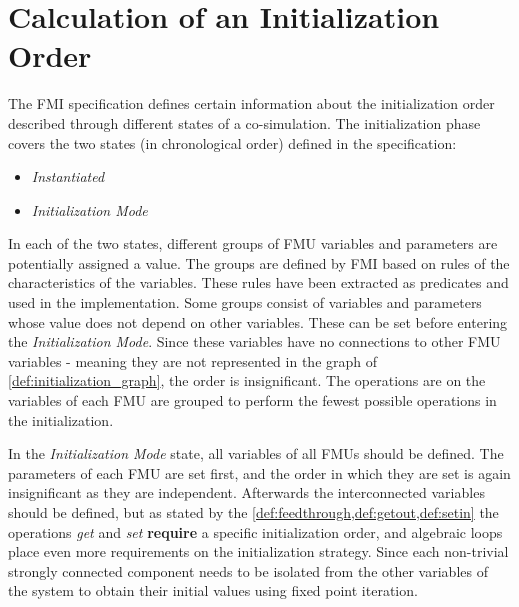 \section{Calculation of an Initialization Order}\label{sc:initilization}
The FMI specification defines certain information about the initialization order described through different states of a co-simulation. The initialization phase covers the two states (in chronological order) defined in the specification:
\begin{itemize}
    \item \textit{Instantiated}
    \item \textit{Initialization Mode}
\end{itemize}
In each of the two states, different groups of FMU variables and parameters are potentially assigned a value. The groups are defined by FMI based on rules of the characteristics of the variables. These rules have been extracted as predicates and used in the implementation. 
Some groups consist of variables and parameters whose value does not depend on other variables. These can be set before entering the \textit{Initialization Mode}. Since these variables have no connections to other FMU variables - meaning they are not represented in the graph of \cref{def:initialization_graph}, the order is insignificant. 
The operations are on the variables of each FMU are grouped to perform the fewest possible operations in the initialization. 

In the \textit{Initialization Mode} state, all variables of all FMUs should be defined.
The parameters of each FMU are set first, and the order in which they are set is again insignificant as they are independent.
Afterwards the interconnected variables should be defined, but as stated by the \cref{def:feedthrough,def:getout,def:setin} the operations \textit{get} and \textit{set} \textbf{require} a specific initialization order, and algebraic loops place even more requirements on the initialization strategy. Since each non-trivial strongly connected component needs to be isolated from the other variables of the system to obtain their initial values using fixed point iteration. 


